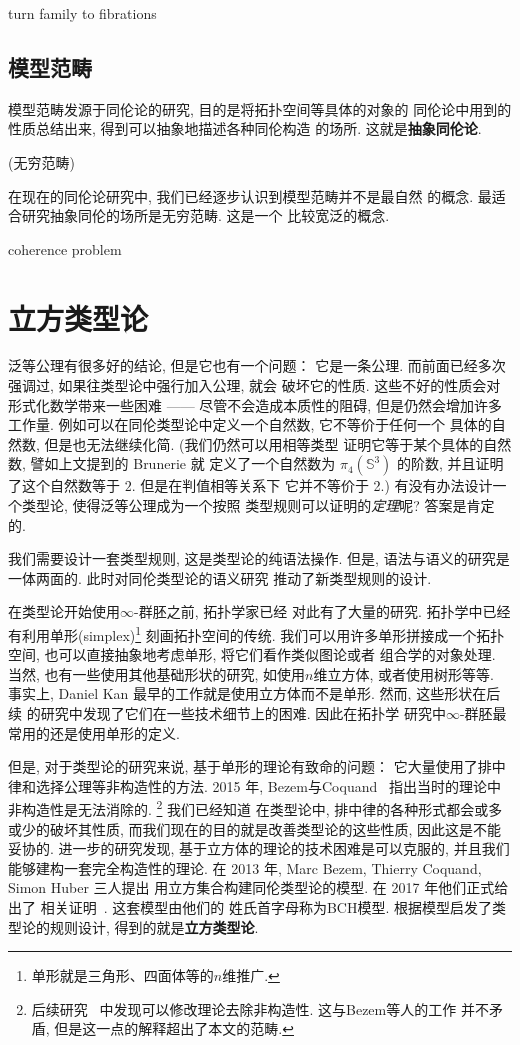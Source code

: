 turn family to fibrations

\subsection{模型范畴} \berryinf
模型范畴发源于同伦论的研究, 目的是将拓扑空间等具体的对象的
同伦论中用到的性质总结出来, 得到可以抽象地描述各种同伦构造
的场所. 这就是\textbf{抽象同伦论}.

(无穷范畴)

在现在的同伦论研究中, 我们已经逐步认识到模型范畴并不是最自然
的概念. 最适合研究抽象同伦的场所是无穷范畴. 这是一个
比较宽泛的概念.

coherence problem

\section{立方类型论}

泛等公理有很多好的结论, 但是它也有一个问题： 它是一条公理.
而前面已经多次强调过, 如果往类型论中强行加入公理, 就会
破坏它的性质. 这些不好的性质会对形式化数学带来一些困难
------ 尽管不会造成本质性的阻碍, 但是仍然会增加许多工作量.
例如可以在同伦类型论中定义一个自然数, 它不等价于任何一个
具体的自然数, 但是也无法继续化简. (我们仍然可以用相等类型
证明它等于某个具体的自然数, 譬如上文提到的 Brunerie 就
定义了一个自然数为 \(\pi_4(\mathbb S^3)\) 的阶数,
并且证明了这个自然数等于 \(2\). 但是在判值相等关系下
它并不等价于 2.)
有没有办法设计一个类型论, 使得泛等公理成为一个按照
类型规则可以证明的\emph{定理}呢? 答案是肯定的.

我们需要设计一套类型规则, 这是类型论的纯语法操作. 但是,
语法与语义的研究是一体两面的. 此时对同伦类型论的语义研究
推动了新类型规则的设计.

在类型论开始使用\(\infty\)-群胚之前, 拓扑学家已经
对此有了大量的研究. 拓扑学中已经有利用单形(simplex)\footnote{单形就是三角形、四面体等的\(n\)维推广.}
刻画拓扑空间的传统. 我们可以用许多单形拼接成一个拓扑空间,
也可以直接抽象地考虑单形, 将它们看作类似图论或者
组合学的对象处理. 当然, 也有一些使用其他基础形状的研究,
如使用\(n\)维立方体, 或者使用树形等等. 事实上, Daniel Kan
最早的工作就是使用立方体而不是单形. 然而, 这些形状在后续
的研究中发现了它们在一些技术细节上的困难. 因此在拓扑学
研究中\(\infty\)-群胚最常用的还是使用单形的定义.

但是, 对于类型论的研究来说, 基于单形的理论有致命的问题：
它大量使用了排中律和选择公理等非构造性的方法. 2015
年, Bezem与Coquand~\cite{bezem:2015:simplicial}
指出当时的理论中非构造性是无法消除的.%
\footnote{后续研究~\cite{henry:2019:constructive}
中发现可以修改理论去除非构造性. 这与Bezem等人的工作
并不矛盾, 但是这一点的解释超出了本文的范畴.} 我们已经知道
在类型论中, 排中律的各种形式都会或多或少的破坏其性质,
而我们现在的目的就是改善类型论的这些性质, 因此这是不能妥协的.
进一步的研究发现, 基于立方体的理论的技术困难是可以克服的,
并且我们能够建构一套完全构造性的理论. 在 2013 年,
Marc Bezem, Thierry Coquand, Simon Huber 三人提出
用立方集合构建同伦类型论的模型. 在 2017 年他们正式给出了
相关证明~\cite{bch:2017:cubical}. 这套模型由他们的
姓氏首字母称为BCH模型. 根据模型启发了类型论的规则设计,
得到的就是\textbf{立方类型论}.

